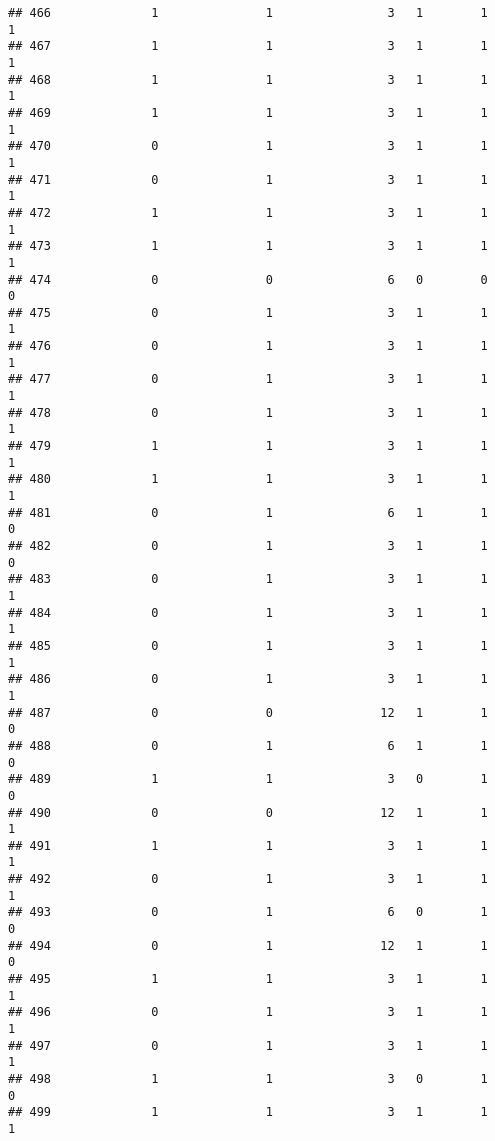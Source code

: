 \documentclass[]{article}
\begin{document}
\begin{verbatim}
## 466              1               1                3   1        1        1
## 467              1               1                3   1        1        1
## 468              1               1                3   1        1        1
## 469              1               1                3   1        1        1
## 470              0               1                3   1        1        1
## 471              0               1                3   1        1        1
## 472              1               1                3   1        1        1
## 473              1               1                3   1        1        1
## 474              0               0                6   0        0        0
## 475              0               1                3   1        1        1
## 476              0               1                3   1        1        1
## 477              0               1                3   1        1        1
## 478              0               1                3   1        1        1
## 479              1               1                3   1        1        1
## 480              1               1                3   1        1        1
## 481              0               1                6   1        1        0
## 482              0               1                3   1        1        0
## 483              0               1                3   1        1        1
## 484              0               1                3   1        1        1
## 485              0               1                3   1        1        1
## 486              0               1                3   1        1        1
## 487              0               0               12   1        1        0
## 488              0               1                6   1        1        0
## 489              1               1                3   0        1        0
## 490              0               0               12   1        1        1
## 491              1               1                3   1        1        1
## 492              0               1                3   1        1        1
## 493              0               1                6   0        1        0
## 494              0               1               12   1        1        0
## 495              1               1                3   1        1        1
## 496              0               1                3   1        1        1
## 497              0               1                3   1        1        1
## 498              1               1                3   0        1        0
## 499              1               1                3   1        1        1

\end{verbatim}
\end{document}
